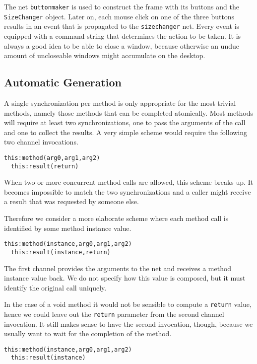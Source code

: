 
The net \texttt{buttonmaker} is used to construct the
frame with its buttons and the \texttt{SizeChanger} object.
Later on, each mouse click on one of the three buttons results
in an event that is propagated to the \texttt{sizechanger} net.
Every event is equipped with a command string that determines
the action to be taken. It is always a good idea to be able
to close a window, because otherwise an undue amount of uncloseable windows
might accumulate on the desktop.


\subsection{Automatic Generation}

A single synchronization per method
is only appropriate for the most trivial methods, namely those
methods that can be completed atomically. Most methods will require
at least two synchronizations, one to pass the arguments of the
call and one to collect the results. A very simple scheme would require
the following two channel invocations.
\begin{lstlisting}[style=xnonfloating]
  this:method(arg0,arg1,arg2)
  this:result(return)
\end{lstlisting}
When two or more concurrent method calls are allowed, this scheme
breaks up. It becomes impossible to match the two synchronizations
and a caller might receive a result that was requested by someone else.

Therefore we consider a more elaborate scheme where each method call
is identified by some method instance value.
\begin{lstlisting}[style=xnonfloating]
  this:method(instance,arg0,arg1,arg2)
  this:result(instance,return)
\end{lstlisting}
The first channel provides the arguments to the net and receives a
method instance value back. We do not specify how this value
is composed, but it must identify the original call uniquely.

In the case of a void method it would not be sensible to compute
a \texttt{return} value, hence we could leave out the
\texttt{return} parameter from the second channel invocation. It
still makes sense to have the second invocation, though, because
we usually want to wait for the completion of the method.
\begin{lstlisting}[style=xnonfloating]
  this:method(instance,arg0,arg1,arg2)
  this:result(instance)
\end{lstlisting}

